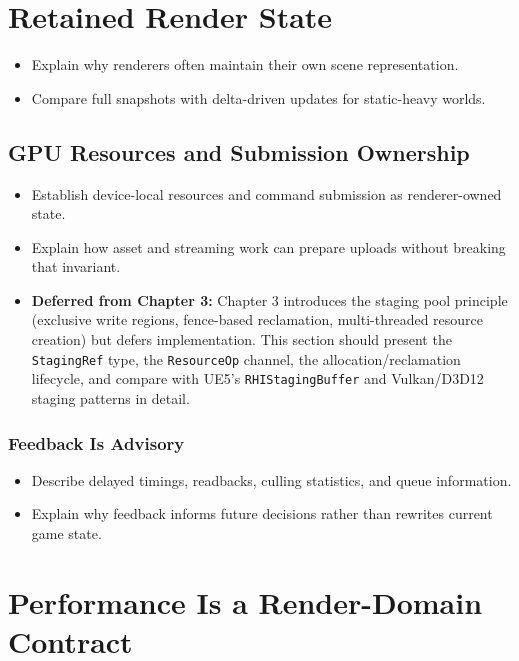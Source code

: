 \documentclass[
  11pt,
  letterpaper,
  DIV=11,
  numbers=noendperiod,
  twoside,
  open=right]{scrreprt}
\providecommand{\tightlist}{%
  \setlength{\itemsep}{0pt}\setlength{\parskip}{0pt}}
\begin{document}
\section{Retained Render State}\label{retained-render-state}

\begin{itemize}
\tightlist
\item
  Explain why renderers often maintain their own scene representation.
\item
  Compare full snapshots with delta-driven updates for static-heavy
  worlds.
\end{itemize}

\subsection{GPU Resources and Submission
Ownership}\label{gpu-resources-and-submission-ownership}

\begin{itemize}
\tightlist
\item
  Establish device-local resources and command submission as
  renderer-owned state.
\item
  Explain how asset and streaming work can prepare uploads without
  breaking that invariant.
\item
  \textbf{Deferred from Chapter 3:} Chapter 3 introduces the staging
  pool principle (exclusive write regions, fence-based reclamation,
  multi-threaded resource creation) but defers implementation. This
  section should present the \texttt{StagingRef} type, the
  \texttt{ResourceOp} channel, the allocation/reclamation lifecycle, and
  compare with UE5's \texttt{RHIStagingBuffer} and Vulkan/D3D12 staging
  patterns in detail.
\end{itemize}

\subsubsection{Feedback Is Advisory}\label{feedback-is-advisory}

\begin{itemize}
\tightlist
\item
  Describe delayed timings, readbacks, culling statistics, and queue
  information.
\item
  Explain why feedback informs future decisions rather than rewrites
  current game state.
\end{itemize}

\section{Performance Is a Render-Domain
Contract}\label{performance-is-a-render-domain-contract}
\end{document}
